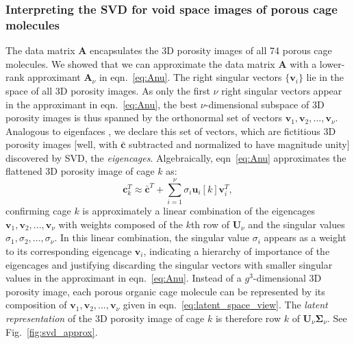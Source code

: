 \documentclass[journal=jacsat,manuscript=article,layout=traditional]{achemso}
\begin{document}
\subsubsection{Interpreting the SVD for void space images of porous cage molecules}
The data matrix $\mathbf{A}$ encapsulates the 3D porosity images of all 74 porous cage molecules. 
We showed that we can approximate the data matrix $\mathbf{A}$ with a lower-rank approximant $\mathbf{A}_\nu$ in eqn.~\ref{eq:Anu}. 
The right singular vectors $\{\mathbf{v}_i\}$ lie in the space of all 3D porosity images. As only the first $\nu$ right singular vectors appear in the approximant in eqn.~\ref{eq:Anu}, the best $\nu$-dimensional subspace of 3D porosity images is thus spanned by the orthonormal set of vectors $\mathbf{v}_1, \mathbf{v}_2, ..., \mathbf{v}_\nu$. Analogous to eigenfaces \cite{turk1991face,muller2004singular}, we declare this set of vectors, which are fictitious 3D porosity images [well, with $\bar{\mathbf{c}}$ subtracted and normalized to have magnitude unity] discovered by SVD, the \emph{eigencages}. Algebraically, eqn~\ref{eq:Anu} approximates the flattened 3D porosity image of cage $k$ as:
\begin{equation}
\mathbf{c}_k^T\approx \bar{\mathbf{c}}^T + \sum_{i=1}^\nu \sigma_i \mathbf{u}_i[k] \mathbf{v}_i^T,
\label{eq:latent_space_view}
\end{equation} confirming cage $k$ is approximately a linear combination of the eigencages $\mathbf{v}_1, \mathbf{v}_2, ..., \mathbf{v}_\nu$ with weights composed of the $k$th row of $\mathbf{U}_\nu$ and the singular values $\sigma_1, \sigma_2 ,...,\sigma_\nu$. In this linear combination, the singular value $\sigma_i$ appears as a weight to its corresponding eigencage $\mathbf{v}_i$, indicating a hierarchy of importance of the eigencages and justifying discarding the singular vectors with smaller singular values in the approximant in eqn.~\ref{eq:Anu}. Instead of a $g^3$-dimensional 3D porosity image, each porous organic cage molecule can be represented by its composition of $\mathbf{v}_1, \mathbf{v}_2, ..., \mathbf{v}_\nu$ given in eqn.~\ref{eq:latent_space_view}. The \emph{latent representation} of the 3D porosity image of cage $k$ is therefore row $k$ of $\mathbf{U}_\nu \mathbf{\Sigma}_\nu$. See Fig.~\ref{fig:svd_approx}.
\end{document}
